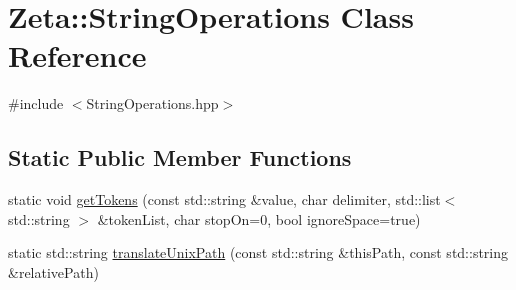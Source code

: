 \hypertarget{classZeta_1_1StringOperations}{\section{Zeta\+:\+:String\+Operations Class Reference}
\label{classZeta_1_1StringOperations}
}


{\ttfamily \#include $<$String\+Operations.\+hpp$>$}

\subsection*{Static Public Member Functions}
\begin{DoxyCompactItemize}
\item 
static void \hyperlink{classZeta_1_1StringOperations_a10b1cba7af0b0c87b276d6c28a0e1d65}{get\+Tokens} (const std\+::string \&value, char delimiter, std\+::list$<$ std\+::string $>$ \&token\+List, char stop\+On=0, bool ignore\+Space=true)
\item 
static std\+::string \hyperlink{classZeta_1_1StringOperations_a31d487a5ff525bbf43569bef675a9e6d}{translate\+Unix\+Path} (const std\+::string \&this\+Path, const std\+::string \&relative\+Path)
\end{DoxyCompactItemize}


